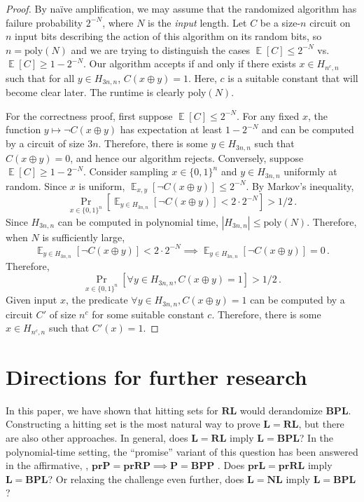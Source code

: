 \documentclass{toc}
\DeclareMathOperator*{\ExpVal}{\mathbb{E}}
\begin{document}
\begin{proof}
By na{\"i}ve amplification, we may assume that the randomized algorithm has failure probability $2^{-N}$, where $N$ is the \emph{input} length. Let $C$ be a size-$n$ circuit on $n$ input bits describing the action of this algorithm on its random bits, so $n = \text{poly}(N)$ and we are trying to distinguish the cases $\ExpVal[C] \leq 2^{-N}$ vs.\ $\ExpVal[C] \geq 1 - 2^{-N}$. Our algorithm accepts if and only if there exists $x \in H_{n^c, n}$ such that for all $y \in H_{3n, n}$, $C(x \oplus y) = 1$. Here, $c$ is a suitable constant that will become clear later. The runtime is clearly $\text{poly}(N)$.

For the correctness proof, first suppose $\ExpVal[C] \leq 2^{-N}$. For any fixed $x$, the function $y \mapsto \neg C(x \oplus y)$ has expectation at least $1 - 2^{-N}$ and can be computed by a circuit of size $3n$. Therefore, there is some $y \in H_{3n, n}$ such that $C(x \oplus y) = 0$, and hence our algorithm rejects. Conversely, suppose $\ExpVal[C] \geq 1 - 2^{-N}$. Consider sampling $x \in \{0, 1\}^n$ and $y \in H_{3n, n}$ uniformly at random. Since $x$ is uniform, $\ExpVal_{x, y}[\neg C(x \oplus y)] \leq 2^{-N}$. By Markov's inequality,
$$
\Pr_{x \in \{0, 1\}^n}\left[\ExpVal_{y \in H_{3n, n}}[\neg C(x \oplus y)] < 2 \cdot 2^{-N}\right] > 1/2\,.
$$
Since $H_{3n, n}$ can be computed in polynomial time, $|H_{3n, n}| \leq \text{poly}(N)$. Therefore, when $N$ is sufficiently large,
$$
\ExpVal_{y \in H_{3n, n}}[\neg C(x \oplus y)] < 2 \cdot 2^{-N} \implies \ExpVal_{y \in H_{3n, n}}[\neg C(x \oplus y)] = 0\,.
$$
Therefore,
$$
\Pr_{x \in \{0, 1\}^n}\left[ \forall y \in H_{3n, n}, C(x \oplus y) = 1 \right] > 1/2\,.
$$
Given input $x$, the predicate $\forall y \in H_{3n, n}, C(x \oplus y) = 1$ can be computed by a circuit $C'$ of size $n^c$ for some suitable constant $c$. Therefore, there is some $x \in H_{n^c, n}$ such that $C'(x) = 1$.
\end{proof}

\section{Directions for further research}

In this paper, we have shown that hitting sets for $\mathbf{RL}$ would derandomize $\mathbf{BPL}$. Constructing a hitting set is the most natural way to prove $\mathbf{L} = \mathbf{RL}$, but there are also other approaches. In general, does $\mathbf{L} = \mathbf{RL}$ imply $\mathbf{L}= \mathbf{BPL}$? In the polynomial-time setting, the ``promise'' variant of this question has been answered in the affirmative, \ie, $\mathbf{prP} = \mathbf{prRP} \implies \mathbf{P} = \mathbf{BPP}$ \cite{BF99}. Does $\mathbf{prL} = \mathbf{prRL}$ imply $\mathbf{L}= \mathbf{BPL}$? Or relaxing the challenge even further, does $\mathbf{L} = \mathbf{NL}$ imply $\mathbf{L}= \mathbf{BPL}$?
\end{document}
